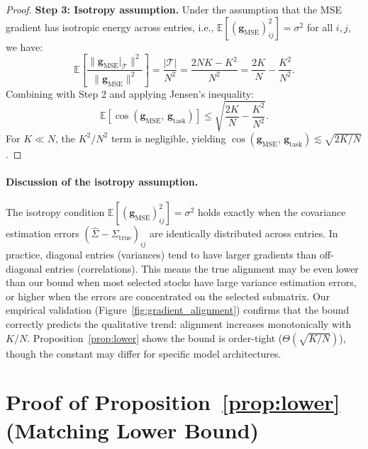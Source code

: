 \documentclass[letterpaper]{article}
\newcommand{\bSigma}{\hat{\Sigma}}
\begin{document}
\begin{proof}
\textbf{Step 3: Isotropy assumption.}
Under the assumption that the MSE gradient has isotropic energy across entries, i.e., $\mathbb{E}[(\mathbf{g}_{\mathrm{MSE}})_{ij}^2] = \sigma^2$ for all $i,j$, we have:
\begin{equation}
\mathbb{E}\!\left[\frac{\|\mathbf{g}_{\mathrm{MSE}}|_{\mathcal{T}}\|^2}{\|\mathbf{g}_{\mathrm{MSE}}\|^2}\right] = \frac{|\mathcal{T}|}{N^2} = \frac{2NK - K^2}{N^2} = \frac{2K}{N} - \frac{K^2}{N^2}.
\end{equation}
Combining with Step 2 and applying Jensen's inequality:
\begin{equation}
\mathbb{E}\!\left[\cos(\mathbf{g}_{\mathrm{MSE}},\, \mathbf{g}_{\mathrm{task}})\right] \leq \sqrt{\frac{2K}{N} - \frac{K^2}{N^2}}.
\end{equation}
For $K \ll N$, the $K^2/N^2$ term is negligible, yielding $\cos(\mathbf{g}_{\mathrm{MSE}},\, \mathbf{g}_{\mathrm{task}}) \lesssim \sqrt{2K/N}$.
\end{proof}

\paragraph{Discussion of the isotropy assumption.}
The isotropy condition $\mathbb{E}[(\mathbf{g}_{\mathrm{MSE}})_{ij}^2] = \sigma^2$ holds exactly when the covariance estimation errors $(\bSigma - \Sigma_{\text{true}})_{ij}$ are identically distributed across entries. In practice, diagonal entries (variances) tend to have larger gradients than off-diagonal entries (correlations). This means the true alignment may be even lower than our bound when most selected stocks have large variance estimation errors, or higher when the errors are concentrated on the selected submatrix. Our empirical validation (Figure~\ref{fig:gradient_alignment}) confirms that the bound correctly predicts the qualitative trend: alignment increases monotonically with $K/N$. Proposition~\ref{prop:lower} shows the bound is order-tight ($\Theta(\sqrt{K/N})$), though the constant may differ for specific model architectures.

\section{Proof of Proposition~\ref{prop:lower} (Matching Lower Bound)}
\label{app:lower_proof}
\end{document}
